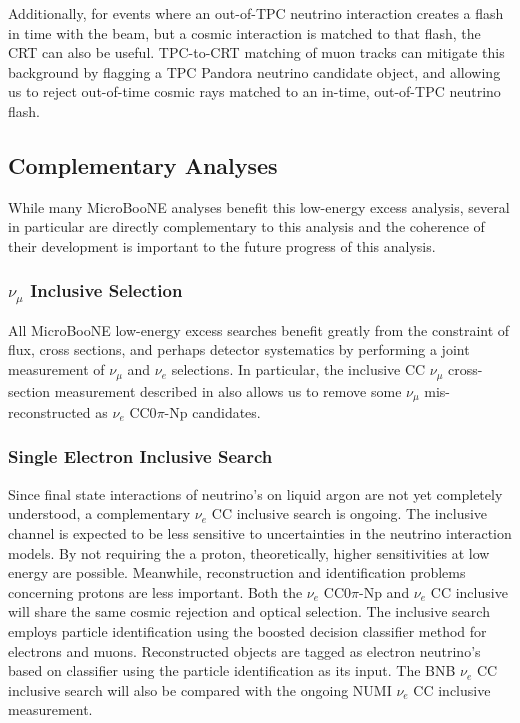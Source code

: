 Additionally, for events where an out-of-TPC neutrino interaction creates a flash in time with the beam, but a cosmic interaction is matched to that flash, the CRT can also be useful.  TPC-to-CRT matching of muon tracks can mitigate this background by flagging a TPC Pandora neutrino candidate object, and allowing us to reject out-of-time cosmic rays matched to an in-time, out-of-TPC neutrino flash.

\subsection{Complementary Analyses}

While many MicroBooNE analyses benefit this low-energy excess analysis, several in particular are directly complementary to this analysis and the coherence of their development is important to the future progress of this analysis.

\subsubsection{\texorpdfstring{$\nu_{\mu}$}{numu} Inclusive Selection}

All MicroBooNE low-energy excess searches benefit greatly from the constraint of flux, cross sections, and perhaps detector systematics by performing a joint measurement of $\nu_\mu$ and $\nu_e$ selections. In particular, the inclusive CC $\nu_\mu$ cross-section measurement described in \cite{ubxsec} also allows us to remove some $\nu_\mu$ mis-reconstructed as $\nu_e$ CC0$\pi$-Np candidates.

\subsubsection{Single Electron Inclusive Search}

Since final state interactions of neutrino's on liquid argon are not yet completely understood, a complementary $\nu_e$ CC inclusive search is ongoing. The inclusive channel is expected to be less sensitive to uncertainties in the neutrino interaction models. By not requiring the a proton, theoretically, higher sensitivities at low energy are possible. Meanwhile, reconstruction and identification problems concerning protons are less important. Both the $\nu_e$ CC0$\pi$-Np and $\nu_e$ CC inclusive will share the same cosmic rejection and optical selection. The inclusive search employs particle identification using the boosted decision classifier method for electrons and muons. Reconstructed objects are tagged as electron neutrino's based on classifier using the particle identification as its input. The BNB $\nu_e$ CC inclusive search will also be compared with the ongoing NUMI $\nu_e$ CC inclusive measurement.

